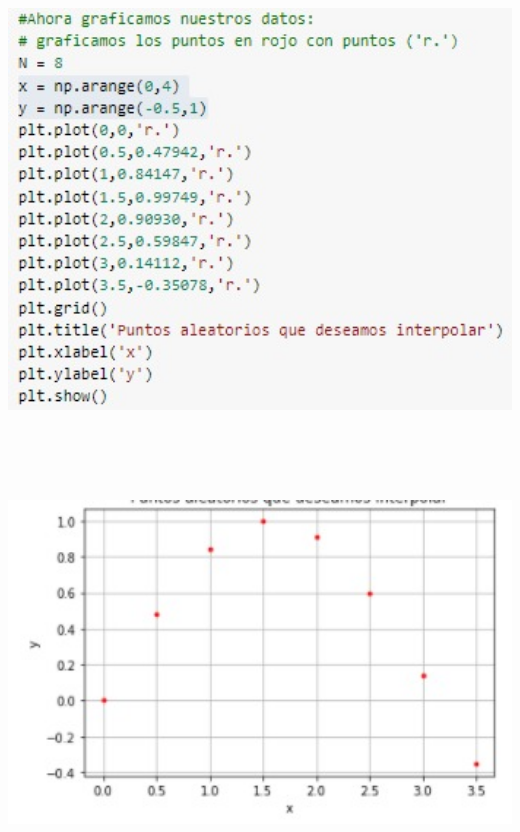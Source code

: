 \documentclass[12pt]{article}
\begin{document}
    \begin{center}
	\includegraphics[height=13cm]{E5.1.jpeg}\\
    \end{center}
    
    \begin{center}
	\includegraphics[height=10cm]{E5.3.jpeg}\\
    \end{center}
\end{document}
